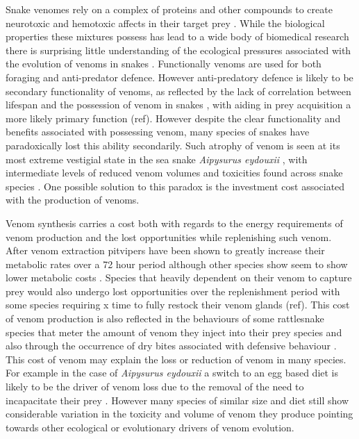Snake venomes rely on a complex of proteins and other compounds to create neurotoxic and hemotoxic affects in their target prey \citep{greene1997snakes,casewell2013complex}. While the biological properties these mixtures possess has lead to a wide body of biomedical research there is surprising little understanding of the ecological pressures associated with the evolution of venoms in snakes \citep{greene1997snakes,casewell2013complex}. Functionally venoms are used for both foraging and anti-predator defence. However anti-predatory defence is likely to be secondary functionality of venoms, as reflected by the lack of correlation between lifespan and the possession of venom in snakes \citep{hossie2013species}, with aiding in prey acquisition a more likely primary function (ref). However despite the clear functionality and benefits associated with possessing venom, many species of snakes have paradoxically lost this ability secondarily. Such atrophy of venom is seen at its most extreme vestigial state in the sea snake \textit{Aipysurus eydouxii} \citep{li2005eggs}, with intermediate levels of reduced venom volumes and toxicities found across snake species \citep{fry2012structural}. One possible solution to this paradox is the investment cost associated with the production of venoms.


Venom synthesis carries a cost both with regards to the energy requirements of venom production and the lost opportunities while replenishing such venom. After venom extraction pitvipers have been shown to greatly increase their metabolic rates over a 72 hour period \cite{mccue2006cost} although other species show seem to show lower metabolic costs \citep{pintor2010costs}. Species that heavily dependent on their venom to capture prey would also undergo lost opportunities over the replenishment period with some species requiring x time to fully restock their venom glands (ref). This cost of venom production is also reflected in the behaviours of some rattlesnake species that meter the amount of venom they inject into their prey species \citep{hayes1995venom} and also through the occurrence of dry bites associated with defensive behaviour \citep{morgenstern2013venom}. This cost of venom may explain the loss or reduction of venom in many species. For example in the case of \textit{Aipysurus eydouxii} a switch to an egg based diet is likely to be the driver of venom loss due to the removal of the need to incapacitate their prey \citep{li2005eggs}. However many species of similar size and diet still show considerable variation in the toxicity and volume of venom they produce pointing towards other ecological or evolutionary drivers of venom evolution.


